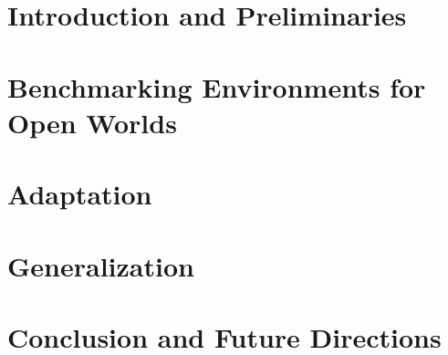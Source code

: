 \documentclass[11pt,twoside]{report}
\theoremstyle{plain}
\numberwithin{definition}{section}
\numberwithin{theorem}{section}
\numberwithin{lemma}{section}
\numberwithin{proposition}{section}
\numberwithin{corollary}{section}
\numberwithin{remark}{section}
\numberwithin{example}{section}
\begin{document}
\pagestyle{plain}




\begin{doublespace}







\tableofcontents
\listoftables
\listoffigures
\cleardoublepage


\pagestyle{fancy}




\part{Introduction and Preliminaries}




\part{Benchmarking Environments for Open Worlds}


\part{Adaptation}


\part{Generalization}



\part{Conclusion and Future Directions}


\end{doublespace}




\end{document}
